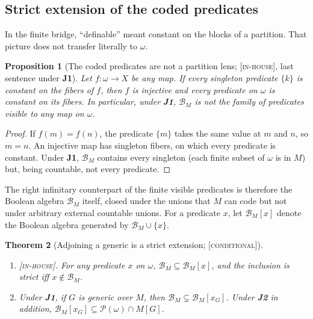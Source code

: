 \documentclass[11pt]{article}
\newcommand{\powset}{\mathcal{P}}
\newcommand{\gradetag}[1]{\textnormal{\textsc{[#1]}}}
\newcommand{\inhouse}{\gradetag{in-house}}
\newcommand{\condg}{\gradetag{conditional}}
\newtheorem{theorem}{Theorem}[section]
\newtheorem{proposition}[theorem]{Proposition}
\theoremstyle{definition}
\begin{document}
\subsection{Strict extension of the coded predicates}\label{ssec:strict}

In the finite bridge, ``definable'' meant constant on the blocks of a partition. That picture
does not transfer literally to $\omega$.

\begin{proposition}[The coded predicates are not a partition lens; \inhouse, last sentence under \textbf{J1}]\label{prop:nolens}
Let $f\colon\omega\to X$ be any map. If every singleton predicate $\{k\}$ is constant on the fibers
of $f$, then $f$ is injective and \emph{every} predicate on $\omega$ is constant on its fibers. In
particular, under \textbf{J1}, $\mathcal B_M$ is not the family of predicates visible to any map on
$\omega$.
\end{proposition}

\begin{proof}
If $f(m)=f(n)$, the predicate $\{m\}$ takes the same value at $m$ and $n$, so $m=n$. An injective
map has singleton fibers, on which every predicate is constant. Under \textbf{J1},
$\mathcal B_M$ contains every singleton (each finite subset of $\omega$ is in $M$) but, being
countable, not every predicate.
\end{proof}

The right infinitary counterpart of the finite visible predicates is therefore the Boolean algebra
$\mathcal B_M$ itself, closed under the unions that $M$ can code but not under arbitrary external
countable unions. For a predicate $x$, let $\mathcal B_M[x]$ denote the Boolean algebra generated by
$\mathcal B_M\cup\{x\}$.

\begin{theorem}[Adjoining a generic is a strict extension; \condg]\label{thm:strict}
\begin{enumerate}\itemsep0pt
\item \inhouse. For any predicate $x$ on $\omega$, $\mathcal B_M\subseteq\mathcal B_M[x]$, and the
inclusion is strict iff $x\notin\mathcal B_M$.
\item Under \textbf{J1}, if $G$ is generic over $M$, then $\mathcal B_M\subsetneq\mathcal
B_M[x_G]$. Under \textbf{J2} in addition, $\mathcal B_M[x_G]\subseteq\powset(\omega)\cap M[G]$.
\end{enumerate}
\end{theorem}
\end{document}
